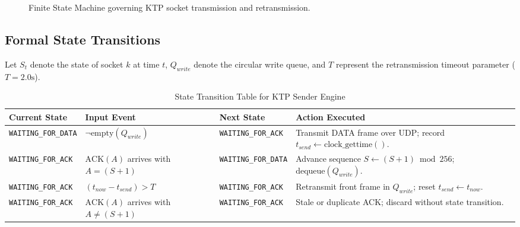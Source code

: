 \documentclass[11pt,a4paper]{article}
\begin{document}
\begin{figure}[htbp]
\caption{Finite State Machine governing KTP socket transmission and retransmission.}
\label{fig:fsm}
\end{figure}

\subsection{Formal State Transitions}
Let $S_t$ denote the state of socket $k$ at time $t$, $Q_{write}$ denote the circular write queue, and $T$ represent the retransmission timeout parameter ($T = 2.0\text{s}$).

\begin{table}[htbp]
\centering
\small
\caption{State Transition Table for KTP Sender Engine}
\label{tab:state_table}
\begin{tabularx}{\linewidth}{>{\raggedright\arraybackslash}p{3.3cm}>{\raggedright\arraybackslash}p{2.6cm}>{\raggedright\arraybackslash}p{3.3cm}X}
\toprule
\textbf{Current State} & \textbf{Input Event} & \textbf{Next State} & \textbf{Action Executed} \\
\midrule
\texttt{WAITING\_FOR\_DATA} & $\lnot \text{empty}(Q_{write})$ & \texttt{WAITING\_FOR\_ACK} & Transmit DATA frame over UDP; record $t_{send} \leftarrow \text{clock\_gettime}()$. \\
\addlinespace
\texttt{WAITING\_FOR\_ACK} & $\text{ACK}(A)$ arrives with $A = (S+1)$ & \texttt{WAITING\_FOR\_DATA} & Advance sequence $S \leftarrow (S+1)\bmod 256$; $\text{dequeue}(Q_{write})$. \\
\addlinespace
\texttt{WAITING\_FOR\_ACK} & $(t_{now} - t_{send}) > T$ & \texttt{WAITING\_FOR\_ACK} & Retransmit front frame in $Q_{write}$; reset $t_{send} \leftarrow t_{now}$. \\
\addlinespace
\texttt{WAITING\_FOR\_ACK} & $\text{ACK}(A)$ arrives with $A \ne (S+1)$ & \texttt{WAITING\_FOR\_ACK} & Stale or duplicate ACK; discard without state transition. \\
\bottomrule
\end{tabularx}
\end{table}
\end{document}
